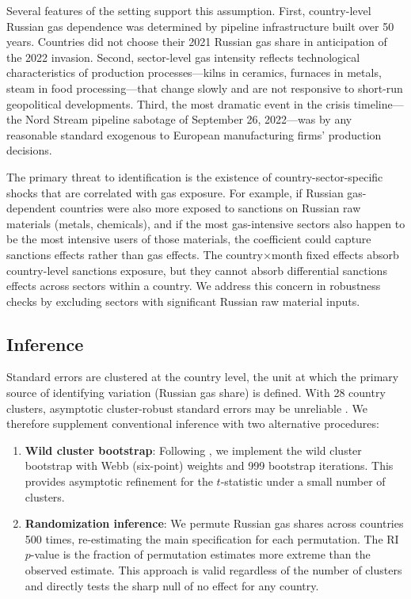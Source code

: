 \documentclass[12pt]{article}
\begin{document}
Several features of the setting support this assumption. First, country-level Russian gas dependence was determined by pipeline infrastructure built over 50 years. Countries did not choose their 2021 Russian gas share in anticipation of the 2022 invasion. Second, sector-level gas intensity reflects technological characteristics of production processes---kilns in ceramics, furnaces in metals, steam in food processing---that change slowly and are not responsive to short-run geopolitical developments. Third, the most dramatic event in the crisis timeline---the Nord Stream pipeline sabotage of September 26, 2022---was by any reasonable standard exogenous to European manufacturing firms' production decisions.

The primary threat to identification is the existence of country-sector-specific shocks that are correlated with gas exposure. For example, if Russian gas-dependent countries were also more exposed to sanctions on Russian raw materials (metals, chemicals), and if the most gas-intensive sectors also happen to be the most intensive users of those materials, the coefficient could capture sanctions effects rather than gas effects. The country$\times$month fixed effects absorb country-level sanctions exposure, but they cannot absorb differential sanctions effects across sectors within a country. We address this concern in robustness checks by excluding sectors with significant Russian raw material inputs.

\subsection{Inference}

Standard errors are clustered at the country level, the unit at which the primary source of identifying variation (Russian gas share) is defined. With 28 country clusters, asymptotic cluster-robust standard errors may be unreliable \citep{cameron2008}. We therefore supplement conventional inference with two alternative procedures:

\begin{enumerate}
    \item \textbf{Wild cluster bootstrap}: Following \citet{cameron2008}, we implement the wild cluster bootstrap with Webb (six-point) weights and 999 bootstrap iterations. This provides asymptotic refinement for the $t$-statistic under a small number of clusters.
    \item \textbf{Randomization inference}: We permute Russian gas shares across countries 500 times, re-estimating the main specification for each permutation. The RI $p$-value is the fraction of permutation estimates more extreme than the observed estimate. This approach is valid regardless of the number of clusters and directly tests the sharp null of no effect for any country.
\end{enumerate}
\end{document}
